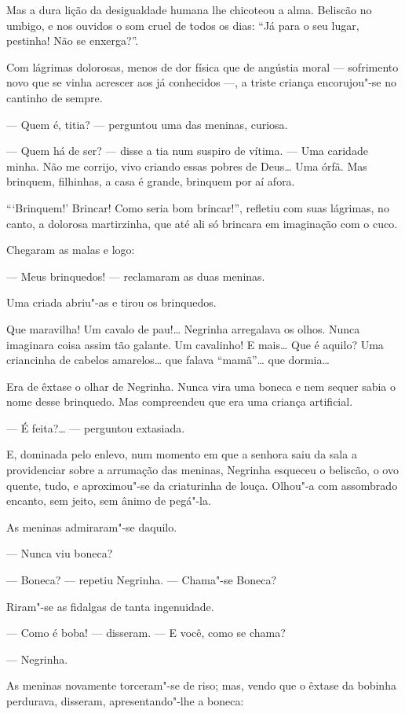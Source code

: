 Mas a dura lição da desigualdade humana lhe chicoteou a alma. Beliscão
no umbigo, e nos ouvidos o som cruel de todos os dias: ``Já para o seu
lugar, pestinha! Não se enxerga?''.

Com lágrimas dolorosas, menos de dor física que de angústia moral ---
sofrimento novo que se vinha acrescer aos já conhecidos ---, a triste
criança encorujou"-se no cantinho de sempre.

--- Quem é, titia? --- perguntou uma das meninas, curiosa.

--- Quem há de ser? --- disse a tia num suspiro de vítima. --- Uma
caridade minha. Não me corrijo, vivo criando essas pobres de Deus\ldots{} Uma
órfã. Mas brinquem, filhinhas, a casa é grande, brinquem por aí afora.

```Brinquem!' Brincar! Como seria bom brincar!'', refletiu com suas
lágrimas, no canto, a dolorosa martirzinha, que até ali só brincara em
imaginação com o cuco.

Chegaram as malas e logo:

--- Meus brinquedos! --- reclamaram as duas meninas.

Uma criada abriu"-as e tirou os brinquedos.

Que maravilha! Um cavalo de pau!\ldots{} Negrinha arregalava os olhos. Nunca
imaginara coisa assim tão galante. Um cavalinho! E mais\ldots{} Que é aquilo?
Uma criancinha de cabelos amarelos\ldots{} que falava ``mamã''\ldots{} que
dormia\ldots{}

Era de êxtase o olhar de Negrinha. Nunca vira uma boneca e nem sequer
sabia o nome desse brinquedo. Mas compreendeu que era uma criança
artificial.

--- É feita?\ldots{} --- perguntou extasiada.

E, dominada pelo enlevo, num momento em que a senhora saiu da sala a
providenciar sobre a arrumação das meninas, Negrinha esqueceu o
beliscão, o ovo quente, tudo, e aproximou"-se da criaturinha de louça.
Olhou"-a com assombrado encanto, sem jeito, sem ânimo de pegá"-la.

As meninas admiraram"-se daquilo.

--- Nunca viu boneca?

--- Boneca? --- repetiu Negrinha. --- Chama"-se Boneca?

Riram"-se as fidalgas de tanta ingenuidade.

--- Como é boba! --- disseram. --- E você, como se chama?

--- Negrinha.

As meninas novamente torceram"-se de riso; mas, vendo que o êxtase da
bobinha perdurava, disseram, apresentando"-lhe a boneca:


